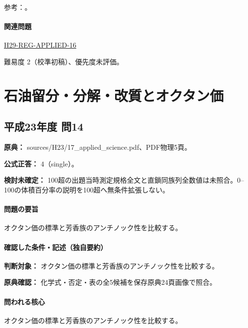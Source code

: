 \par 参考：\cite{organic_chirality,organic_benzene}。

\paragraph{関連問題} \hyperref[q:h29-reg-applied-16]{H29-REG-APPLIED-16}

\par 難易度 2（校準初稿）、優先度未評価。

\section{石油留分・分解・改質とオクタン価}

\subsection{平成23年度 問14}
\label{q:h23-reg-applied-14}

\noindent\textbf{原典：} sources/H23/17\_applied\_science.pdf、PDF物理5頁。

\textbf{公式正答：} 4（single）。

\par\textbf{検討未確定：} 100超の出題当時測定規格全文と直鎖同族列全数値は未照合。0–100の体積百分率の説明を100超へ無条件拡張しない。

\paragraph{問題の要旨} オクタン価の標準と芳香族のアンチノック性を比較する。

\paragraph{確認した条件・記述（独自要約）}\mbox{}\par

\noindent\textbf{判断対象：} オクタン価の標準と芳香族のアンチノック性を比較する。\par

\noindent\textbf{原典確認：} 化学式・否定・表の全5候補を保存原典24頁画像で照合。\par

\paragraph{問われる核心} オクタン価の標準と芳香族のアンチノック性を比較する。

